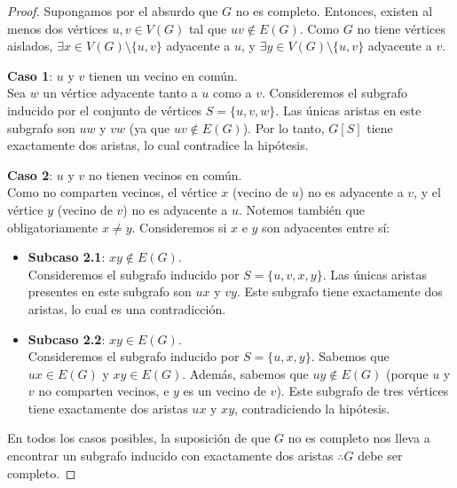 \begin{proof}
    Supongamos por el absurdo que \( G \) no es completo. Entonces, existen al menos dos vértices \( u, v \in V(G) \) tal que \( uv \notin E(G) \). Como \( G \) no tiene vértices aislados, \( \exists x \in V(G) \setminus \{ u, v\} \) adyacente a \( u \), y \( \exists y \in V(G) \setminus \{ u, v\} \) adyacente a \( v \).

    \textbf{Caso 1}: \( u \) y \( v \) tienen un vecino en común. \\
    Sea \( w \) un vértice adyacente tanto a \( u \) como a \( v \). Consideremos el subgrafo inducido por el conjunto de vértices \( S = \{u, v, w\} \). Las únicas aristas en este subgrafo son \( uw \) y \( vw \) (ya que \( uv \notin E(G) \)). Por lo tanto, \( G[S] \) tiene exactamente dos aristas, lo cual contradice la hipótesis.

    \textbf{Caso 2}: \( u \) y \( v \) no tienen vecinos en común. \\
    Como no comparten vecinos, el vértice \( x \) (vecino de \( u \)) no es adyacente a \( v \), y el vértice \( y \) (vecino de \( v \)) no es adyacente a \( u \). Notemos también que obligatoriamente \( x \neq y \). Consideremos si \( x \) e \( y \) son adyacentes entre sí:

    \begin{itemize}
        \item \textbf{Subcaso 2.1}: \( xy \notin E(G) \). \\
              Consideremos el subgrafo inducido por \( S = \{u, v, x, y\} \). Las únicas aristas presentes en este subgrafo son \( ux \) y \( vy \). Este subgrafo tiene exactamente dos aristas, lo cual es una contradicción.

        \item \textbf{Subcaso 2.2}: \( xy \in E(G) \). \\
              Consideremos el subgrafo inducido por \( S = \{u, x, y\} \). Sabemos que \( ux \in E(G) \) y \( xy \in E(G) \). Además, sabemos que \( uy \notin E(G) \) (porque \( u \) y \( v \) no comparten vecinos, e \( y \) es un vecino de \( v \)). Este subgrafo de tres vértices tiene exactamente dos aristas \( ux \) y \( xy \), contradiciendo la hipótesis.
    \end{itemize}

    En todos los casos posibles, la suposición de que \( G \) no es completo nos lleva a encontrar un subgrafo inducido con exactamente dos aristas \( \therefore G \) debe ser completo.
\end{proof}